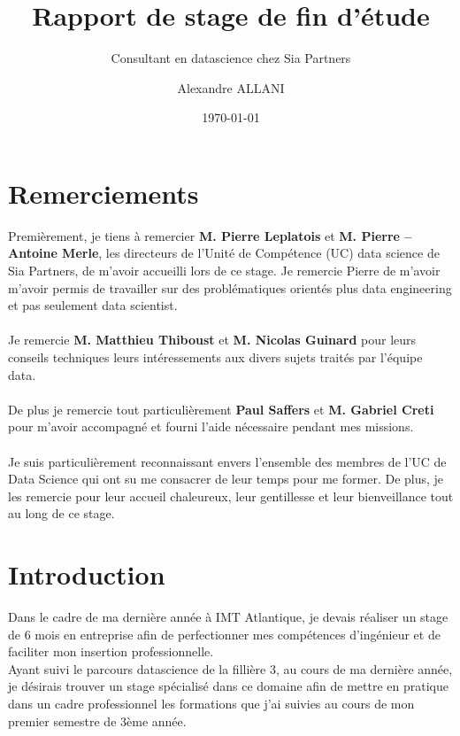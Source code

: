 \documentclass{article} %
\author{Alexandre ALLANI}
\date{\noexpand\today} %
\title{Rapport de stage de fin d'étude}
\subtitle{Consultant en datascience chez Sia Partners}
\begin{document}
\imtaMaketitlepage

\section{Remerciements}
Premièrement, je tiens à remercier \textbf{M. Pierre Leplatois} et \textbf{M. Pierre – Antoine
Merle}, les directeurs de l’Unité de Compétence (UC) data science de Sia Partners, de
m’avoir accueilli lors de ce stage. Je remercie Pierre de m'avoir m'avoir permis de travailler sur des problématiques orientés plus data engineering et pas seulement data scientist.
\\ \\

Je remercie \textbf{M. Matthieu Thiboust} et \textbf{M. Nicolas Guinard}  pour leurs conseils techniques leurs intéressements aux divers sujets traités par l’équipe data.
\\ \\

De plus je remercie tout particulièrement \textbf{Paul Saffers} et \textbf{M. Gabriel Creti} pour m'avoir accompagné et fourni l'aide nécessaire pendant mes missions. 
\\ \\

Je suis particulièrement reconnaissant envers l’ensemble des membres de l’UC de Data Science qui ont su me consacrer de leur temps pour me former. De plus, je les remercie pour leur accueil chaleureux, leur gentillesse et leur bienveillance tout au long de ce stage.

\newpage

\tableofcontents

\newpage


\section{Introduction}

Dans le cadre de ma dernière année à IMT Atlantique, je devais réaliser un stage
de 6 mois en entreprise afin de perfectionner mes compétences d’ingénieur et de
faciliter mon insertion professionnelle.\\

Ayant suivi le parcours datascience de la fillière 3, au cours de ma dernière année, je désirais trouver un stage spécialisé dans ce domaine afin de mettre en pratique dans un cadre professionnel les formations que j’ai suivies au cours de mon premier semestre de 3ème année.\\
\end{document}
